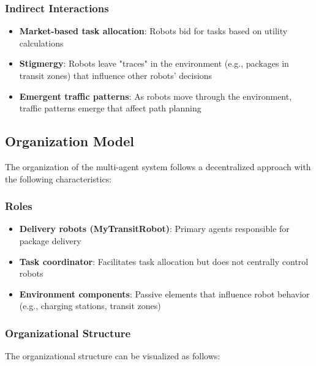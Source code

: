 \documentclass[12pt,a4paper]{article}
\begin{document}
\subsubsection{Indirect Interactions}
\begin{itemize}
    \item \textbf{Market-based task allocation}: Robots bid for tasks based on utility calculations
    \item \textbf{Stigmergy}: Robots leave "traces" in the environment (e.g., packages in transit zones) that influence other robots' decisions
    \item \textbf{Emergent traffic patterns}: As robots move through the environment, traffic patterns emerge that affect path planning
\end{itemize}

\subsection{Organization Model}
The organization of the multi-agent system follows a decentralized approach with the following characteristics:

\subsubsection{Roles}
\begin{itemize}
    \item \textbf{Delivery robots (MyTransitRobot)}: Primary agents responsible for package delivery
    \item \textbf{Task coordinator}: Facilitates task allocation but does not centrally control robots
    \item \textbf{Environment components}: Passive elements that influence robot behavior (e.g., charging stations, transit zones)
\end{itemize}

\subsubsection{Organizational Structure}
The organizational structure can be visualized as follows:
\end{document}
